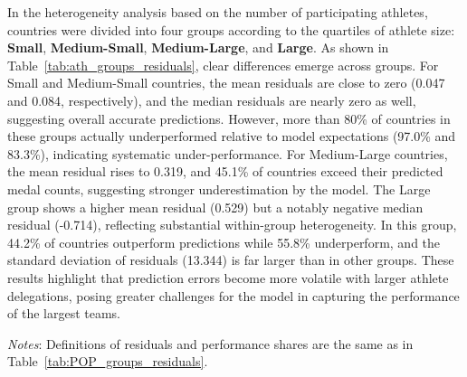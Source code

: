 \documentclass[11pt,twoside]{article}
\numberwithin{Theorem}{section}
\numberwithin{Definition}{section}
\numberwithin{Lemma}{section}
\numberwithin{Algorithm}{section}
\numberwithin{equation}{section}
\begin{document}
In the heterogeneity analysis based on the number of participating athletes, countries were divided into four groups according to the quartiles of athlete size: \textbf{Small}, \textbf{Medium-Small}, \textbf{Medium-Large}, and \textbf{Large}. As shown in Table~\ref{tab:ath_groups_residuals}, clear differences emerge across groups. For Small and Medium-Small countries, the mean residuals are close to zero (0.047 and 0.084, respectively), and the median residuals are nearly zero as well, suggesting overall accurate predictions. However, more than 80\% of countries in these groups actually underperformed relative to model expectations (97.0\% and 83.3\%), indicating systematic under-performance. For Medium-Large countries, the mean residual rises to 0.319, and 45.1\% of countries exceed their predicted medal counts, suggesting stronger underestimation by the model. The Large group shows a higher mean residual (0.529) but a notably negative median residual (-0.714), reflecting substantial within-group heterogeneity. In this group, 44.2\% of countries outperform predictions while 55.8\% underperform, and the standard deviation of residuals (13.344) is far larger than in other groups. These results highlight that prediction errors become more volatile with larger athlete delegations, posing greater challenges for the model in capturing the performance of the largest teams.

\begin{table}[H]
\centering
\caption{Prediction residuals by athlete-size groups}
\label{tab:ath_groups_residuals}
\par\vspace{6pt}
\begin{minipage}{0.95\linewidth}
\raggedright
\footnotesize
\textit{Notes}: Definitions of residuals and performance shares are the same as in Table~\ref{tab:POP_groups_residuals}.
\end{minipage}
\end{table}
\end{document}
